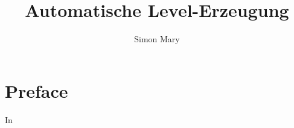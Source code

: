\documentclass[10pt,a4paper]{article}
\begin{document}
\newcommand{\tip}{\rule{10pt}{10pt}\hspace{12pt}}

\newenvironment{command}[1]{\noindent\xrfill{2pt}[orange]\textcolor{orange}{\textbf{#1}}\xrfill{2pt}[orange]}{\noindent\xrfill{2pt}[orange]}

\newcommand{\codenote}[1]{\textcolor{codeNote}{#1}}
	
	
\title{Automatische Level-Erzeugung}
\author{Simon Mary}
\maketitle
\thispagestyle{empty}
\newpage

\section*{Preface}
In 


\end{document}
